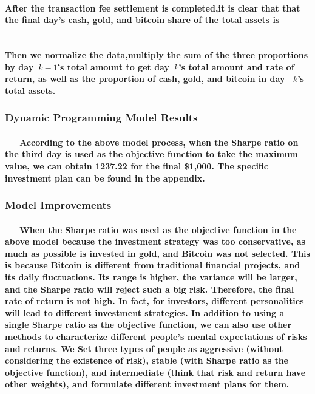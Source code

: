 \documentclass{mcmthesis}
\begin{document}
	\paragraph{
		After the transaction fee settlement is completed,it is clear that that the final day's cash, gold, and bitcoin share of the total assets is
	}
	
	\begin{equation}
		[(1+2\%)c_{k} - (1 \pm 0.01)\bigtriangleup G_{k}-(1 \pm 0.02)\bigtriangleup B_{k}, (1+\overline{G_{k}})g_{k} + \bigtriangleup G_{k}, (1+\overline{B_{k}})b_{k} + \bigtriangleup B_{k}]
	\end{equation}
	
	\paragraph{
		Then we normalize the data,multiply the sum of the three proportions by day\ $k-1$'s total amount to get day\ $k$'s total amount and rate of return, as well as the proportion of cash, gold, and bitcoin in day \ $k$'s total assets.
	}
	


	
	\subsubsection{Dynamic Programming Model Results}
	
	\paragraph{
		\ \ \ According to the above model process, when the Sharpe ratio on the third day is used as the objective function to take the maximum value, we can obtain 1237.22 for the final \$1,000. The specific investment plan can be found in the appendix.
	}
		
	\subsubsection{Model Improvements}
	
	\paragraph{
		\ \ \ When the Sharpe ratio was used as the objective function in the above model because the investment strategy was too conservative, as much as possible is invested in gold, and Bitcoin was not selected. This is because Bitcoin is different from traditional financial projects, and its daily fluctuations. Its range is higher, the variance will be larger, and the Sharpe ratio will reject such a big risk. Therefore, the final rate of return is not high\cite{PSO}.
		In fact, for investors, different personalities will lead to different investment strategies. In addition to using a single Sharpe ratio as the objective function, we can also use other methods to characterize different people's mental expectations of risks and returns. We Set three types of people as aggressive (without considering the existence of risk), stable (with Sharpe ratio as the objective function), and intermediate (think that risk and return have other weights), and formulate different investment plans for them.
	}
	
\end{document}
